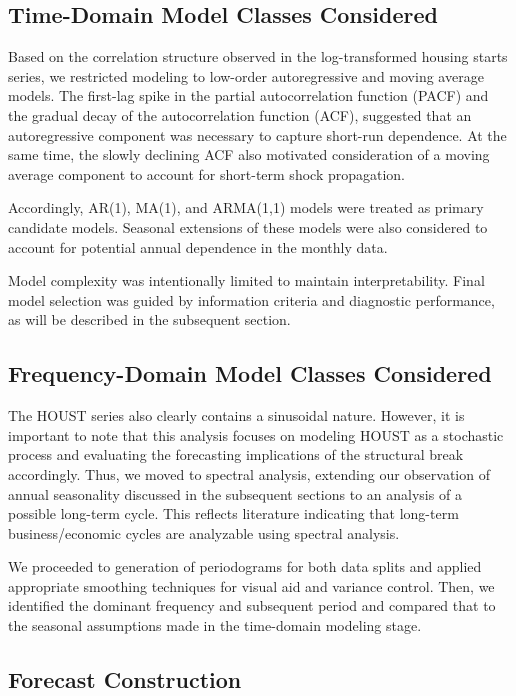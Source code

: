 \documentclass[10pt,twocolumn,letterpaper]{article}
\begin{document}
\subsection{Time-Domain Model Classes Considered}

Based on the correlation structure observed in the log-transformed housing starts series, we restricted modeling to low-order autoregressive and moving average models. The first-lag spike in the partial autocorrelation function (PACF) and the gradual decay of the autocorrelation function (ACF), suggested that an autoregressive component was necessary to capture short-run dependence. At the same time, the slowly declining ACF also motivated consideration of a moving average component to account for short-term shock propagation.

Accordingly, AR(1), MA(1), and ARMA(1,1) models were treated as primary candidate models. Seasonal extensions of these models were also considered to account for potential annual dependence in the monthly data.



Model complexity was intentionally limited to maintain interpretability. Final model selection was guided by information criteria and diagnostic performance, as will be described in the subsequent section.

\subsection{Frequency-Domain Model Classes Considered}

The HOUST series also clearly contains a sinusoidal nature. However, it is important to note that this analysis focuses on modeling HOUST as a stochastic process and evaluating the forecasting implications of the structural break accordingly. Thus, we moved to spectral analysis, extending our observation of annual seasonality discussed in the subsequent sections to an analysis of a possible long-term cycle. This reflects literature indicating that long-term business/economic cycles are analyzable using spectral analysis.\cite{granger1964spectral}

We proceeded to generation of periodograms for both data splits and applied appropriate smoothing techniques for visual aid and variance control. Then, we identified the dominant frequency and subsequent period and compared that to the seasonal assumptions made in the time-domain modeling stage. 

\subsection{Forecast Construction}
\end{document}
